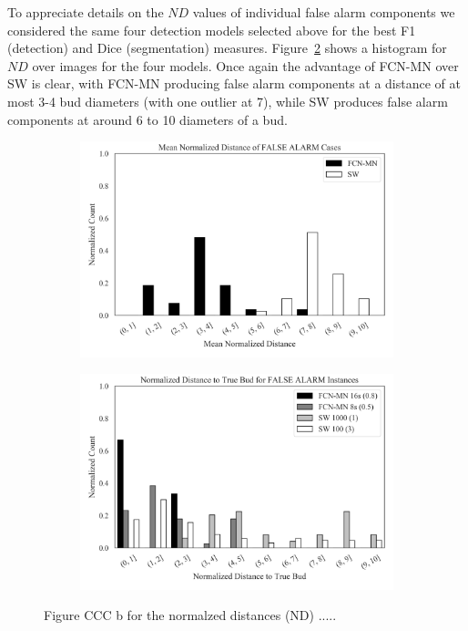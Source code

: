 \documentclass[a4paper,authoryear,review]{elsarticle}
\begin{document}
To appreciate details on the $ND$ values of individual false alarm components we considered the same four detection models selected above for the best F1 (detection) and Dice (segmentation) measures. 
% 
Figure~\ref{fig:CCC-b} shows a histogram for $ND$ over images for the four models. Once again the advantage of FCN-MN over SW is clear, with FCN-MN producing false alarm components at a distance of at most 3-4 bud diameters (with one outlier at 7), while SW produces false alarm components at around 6 to 10 diameters of a bud.

\begin{figure}%
	\centering
	\begin{subfigure}[b]{0.45\textwidth}
		\centering
		\includegraphics[width=\textwidth]{figures/AAA_normalized_distance_falsealarm_fcn_sw.png}
		\caption{}
		\label{fig:CCC-a}
	\end{subfigure}
	\hfill
	\begin{subfigure}[b]{0.45\textwidth}
		\centering
		\includegraphics[width=\textwidth]{figures/CCC_normalized_distance_false_alarm.png}
		\caption{}
		\label{fig:CCC-b}
	\end{subfigure}
	\caption{Figure CCC  b for the normalzed distances (ND) .....}%
	\label{fig:CCC}%
\end{figure}
\end{document}
